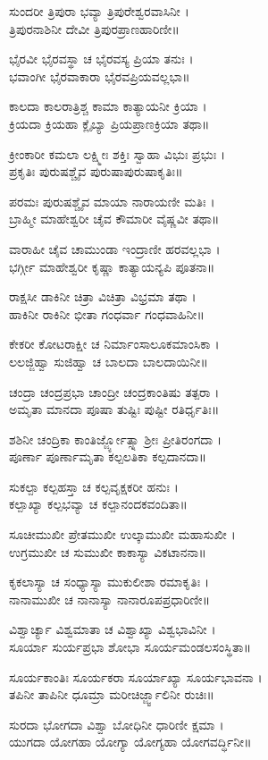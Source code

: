 ಸುಂದರೀ ತ್ರಿಪುರಾ ಭವ್ಯಾ ತ್ರಿಪುರೇಶ್ವರವಾಸಿನೀ ।\\
ತ್ರಿಪುರನಾಶಿನೀ ದೇವೀ ತ್ರಿಪುರಪ್ರಾಣಹಾರಿಣೀ॥

ಭೈರವೀ ಭೈರವಸ್ಥಾ ಚ ಭೈರವಸ್ಯ ಪ್ರಿಯಾ ತನುಃ ।\\
ಭವಾಂಗೀ ಭೈರವಾಕಾರಾ ಭೈರವಪ್ರಿಯವಲ್ಲಭಾ॥

ಕಾಲದಾ ಕಾಲರಾತ್ರಿಶ್ಚ ಕಾಮಾ ಕಾತ್ಯಾಯನೀ ಕ್ರಿಯಾ ।\\
ಕ್ರಿಯದಾ ಕ್ರಿಯಹಾ ಕ್ಲೈಬ್ಯಾ ಪ್ರಿಯಪ್ರಾಣಕ್ರಿಯಾ ತಥಾ॥

ಕ್ರೀಂಕಾರೀ ಕಮಲಾ ಲಕ್ಷ್ಮೀಃ ಶಕ್ತಿಃ ಸ್ವಾಹಾ ವಿಭುಃ ಪ್ರಭುಃ ।\\
ಪ್ರಕೃತಿಃ ಪುರುಷಶ್ಚೈವ ಪುರುಷಾಪುರುಷಾಕೃತಿಃ॥

ಪರಮಃ ಪುರುಷಶ್ಚೈವ ಮಾಯಾ ನಾರಾಯಣೀ ಮತಿಃ ।\\
ಬ್ರಾಹ್ಮೀ ಮಾಹೇಶ್ವರೀ ಚೈವ ಕೌಮಾರೀ ವೈಷ್ಣವೀ ತಥಾ॥

ವಾರಾಹೀ ಚೈವ ಚಾಮುಂಡಾ ಇಂದ್ರಾಣೀ ಹರವಲ್ಲಭಾ ।\\
ಭರ್ಗ್ಗೀ ಮಾಹೇಶ್ವರೀ ಕೃಷ್ಣಾ ಕಾತ್ಯಾಯನ್ಯಪಿ ಪೂತನಾ॥

ರಾಕ್ಷಸೀ ಡಾಕಿನೀ ಚಿತ್ರಾ ವಿಚಿತ್ರಾ ವಿಭ್ರಮಾ ತಥಾ ।\\
ಹಾಕಿನೀ ರಾಕಿನೀ ಭೀತಾ ಗಂಧರ್ವಾ ಗಂಧವಾಹಿನೀ॥

ಕೇಕರೀ ಕೋಟರಾಕ್ಷೀ ಚ ನಿರ್ಮಾಂಸಾಲೂಕಮಾಂಸಿಕಾ ।\\
ಲಲಜ್ಜಿಹ್ವಾ ಸುಜಿಹ್ವಾ ಚ ಬಾಲದಾ ಬಾಲದಾಯಿನೀ॥

ಚಂದ್ರಾ ಚಂದ್ರಪ್ರಭಾ ಚಾಂದ್ರೀ ಚಂದ್ರಕಾಂತಿಷು ತತ್ಪರಾ ।\\
ಅಮೃತಾ ಮಾನದಾ ಪೂಷಾ ತುಷ್ಟಿಃ ಪುಷ್ಟೀ ರತಿರ್ಧೃತಿಃ॥

ಶಶಿನೀ ಚಂದ್ರಿಕಾ ಕಾಂತಿರ್ಜ್ಜ್ಯೋತ್ಸ್ನಾ ಶ್ರೀಃ ಪ್ರೀತಿರಂಗದಾ ।\\
ಪೂರ್ಣಾ ಪೂರ್ಣಾಮೃತಾ ಕಲ್ಪಲತಿಕಾ ಕಲ್ಪದಾನದಾ॥

ಸುಕಲ್ಪಾ ಕಲ್ಪಹಸ್ತಾ ಚ ಕಲ್ಪವೃಕ್ಷಕರೀ ಹನುಃ ।\\
ಕಲ್ಪಾಖ್ಯಾ ಕಲ್ಪಭವ್ಯಾ ಚ ಕಲ್ಪಾನಂದಕವಂದಿತಾ॥

ಸೂಚೀಮುಖೀ ಪ್ರೇತಮುಖೀ ಉಲ್ಕಾಮುಖೀ ಮಹಾಸುಖೀ ।\\
ಉಗ್ರಮುಖೀ ಚ ಸುಮುಖೀ ಕಾಕಾಸ್ಯಾ ವಿಕಟಾನನಾ॥

ಕೃಕಲಾಸ್ಯಾ ಚ ಸಂಧ್ಯಾಸ್ಯಾ ಮುಕುಲೀಶಾ ರಮಾಕೃತಿಃ ।\\
ನಾನಾಮುಖೀ ಚ ನಾನಾಸ್ಯಾ ನಾನಾರೂಪಪ್ರಧಾರಿಣೀ॥

ವಿಶ್ವಾರ್ಚ್ಯಾ ವಿಶ್ವಮಾತಾ ಚ ವಿಶ್ವಾಖ್ಯಾ ವಿಶ್ವಭಾವಿನೀ ।\\
ಸೂರ್ಯಾ ಸುರ್ಯಪ್ರಭಾ ಶೋಭಾ ಸೂರ್ಯಮಂಡಲಸಂಸ್ಥಿತಾ॥

ಸೂರ್ಯಕಾಂತಿಃ ಸೂರ್ಯಕರಾ ಸೂರ್ಯಾಖ್ಯಾ ಸೂರ್ಯಭಾವನಾ ।\\
ತಪಿನೀ ತಾಪಿನೀ ಧೂಮ್ರಾ ಮರೀಚಿರ್ಜ್ಜ್ವಾಲಿನೀ ರುಚಿಃ॥

ಸುರದಾ ಭೋಗದಾ ವಿಶ್ವಾ ಬೋಧಿನೀ ಧಾರಿಣೀ ಕ್ಷಮಾ ।\\
ಯುಗದಾ ಯೋಗಹಾ ಯೋಗ್ಯಾ ಯೋಗ್ಯಹಾ ಯೋಗವರ್ದ್ಧಿನೀ॥


